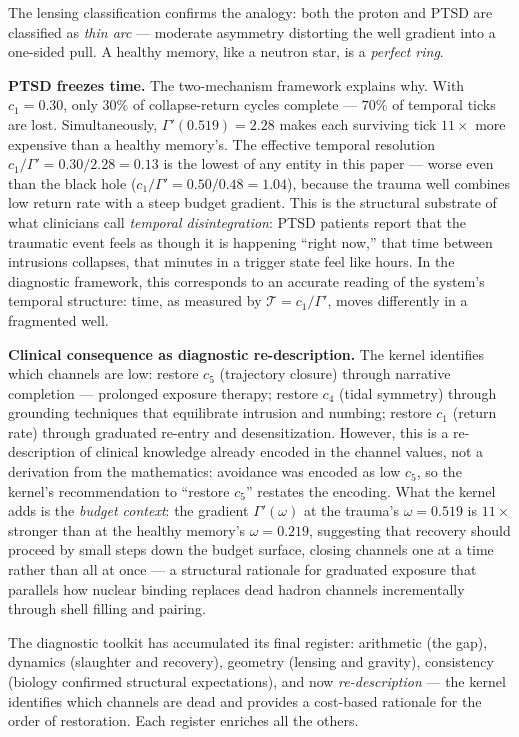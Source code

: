 \documentclass[
  aps,
  prd,
  twocolumn,
  superscriptaddress,
  nofootinbib,
  floatfix
]{revtex4-2}
\newcommand{\Gam}{\Gamma}
\begin{document}
The lensing classification confirms the analogy: both the
proton and PTSD are classified as \emph{thin arc} ---
moderate asymmetry distorting the well gradient into a
one-sided pull.  A healthy memory, like a neutron star, is
a \emph{perfect ring}.

\textbf{PTSD freezes time.}
The two-mechanism framework explains why.  With $c_1 = 0.30$,
only $30\%$ of collapse-return cycles complete --- $70\%$ of
temporal ticks are lost.  Simultaneously, $\Gam'(0.519) =
2.28$ makes each surviving tick $11\times$ more expensive than
a healthy memory's.  The effective temporal resolution
$c_1/\Gam' = 0.30/2.28 = 0.13$ is the lowest of any
entity in this paper --- worse even than the black hole
($c_1/\Gam' = 0.50/0.48 = 1.04$), because the trauma well
combines low return rate with a steep budget gradient.  This is the structural substrate of what
clinicians call \emph{temporal disintegration}: PTSD patients
report that the traumatic event feels as though it is
happening ``right now,'' that time between intrusions
collapses, that minutes in a trigger state feel like hours.
In the diagnostic framework, this corresponds to an
accurate reading of the system's temporal structure:
time, as measured by $\mathcal{T} = c_1/\Gam'$,
moves differently in a fragmented well.

\textbf{Clinical consequence as diagnostic re-description.}
The kernel identifies which channels are low:
restore $c_5$ (trajectory closure) through
narrative completion --- prolonged exposure therapy;
restore $c_4$ (tidal symmetry) through grounding techniques
that equilibrate intrusion and numbing; restore $c_1$
(return rate) through graduated re-entry and
desensitization.  However, this is a re-description of
clinical knowledge already encoded in the channel values,
not a derivation from the mathematics: avoidance was
encoded as low $c_5$, so the kernel's recommendation to
``restore $c_5$'' restates the encoding.
What the kernel adds is the \emph{budget context}: the
gradient $\Gam'(\omega)$ at the trauma's $\omega = 0.519$
is $11\times$ stronger than at the healthy memory's
$\omega = 0.219$, suggesting that recovery should proceed
by small steps down the budget surface, closing channels
one at a time rather than all at once --- a structural
rationale for graduated exposure that parallels how
nuclear binding replaces dead hadron channels incrementally
through shell filling and pairing.

The diagnostic toolkit has accumulated its final register:
arithmetic (the gap), dynamics (slaughter and recovery),
geometry (lensing and gravity), consistency (biology
confirmed structural expectations), and now
\emph{re-description} --- the kernel identifies which
channels are dead and provides a cost-based rationale
for the order of restoration.  Each register
enriches all the others.
\end{document}
